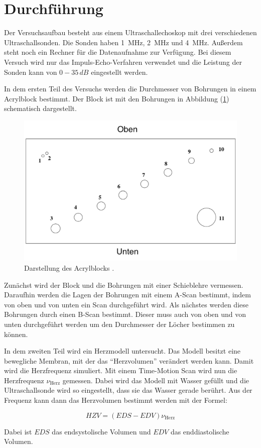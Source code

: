 \section{Durchführung}

Der Versuchsaufbau besteht aus einem Ultraschallechoskop mit drei verschiedenen Ultraschallsonden.
Die Sonden haben \SI{1}{\mega\hertz}, \SI{2}{\mega\hertz} und \SI{4}{\mega\hertz}.
Außerdem steht noch ein Rechner für die Datenaufnahme zur Verfügung.
Bei diesem Versuch wird nur das Impuls-Echo-Verfahren verwendet und die Leistung der
Sonden kann von $0-35 \, dB$ eingestellt werden.

In dem ersten Teil des Versuchs werden die Durchmesser von Bohrungen in einem Acrylblock
bestimmt. Der Block ist mit den Bohrungen in Abbildung (\ref{abb:1}) schematisch dargestellt.

\begin{figure}[H]
  \centering
  \includegraphics[width=\textwidth]{content/Block.png}
  \caption{Darstellung des Acrylblocks \cite{1}.}
  \label{abb:1}
\end{figure}

Zunächst wird der Block und die Bohrungen mit einer Schieblehre vermessen.
Daraufhin werden die Lagen der Bohrungen mit einem A-Scan bestimmt, indem von oben
und von unten ein Scan durchgeführt wird.
Als nächstes werden diese Bohrungen durch einen B-Scan bestimmt. Dieser muss auch von
oben und von unten durchgeführt werden um den Durchmesser der Löcher bestimmen zu können.

In dem zweiten Teil wird ein Herzmodell untersucht. Das Modell besitzt eine bewegliche
Membran, mit der das \enquote{Herzvolumen} verändert werden kann. Damit wird die
Herzfrequenz simuliert.
Mit einem Time-Motion Scan wird nun die Herzfrequenz $\nu_\text{Herz}$ gemessen. Dabei wird das Modell
mit Wasser gefüllt und die Ultraschallsonde wird so eingestellt, dass sie das Wasser gerade
berührt. Aus der Frequenz kann dann das Herzvolumen bestimmt werden mit der Formel:

\begin{equation}
  HZV = (EDS - EDV) \nu_\text{Herz}
  \label{eq:2}
\end{equation}

Dabei ist $EDS$ das endsystolische Volumen und $EDV$ das enddiastolische Volumen.
